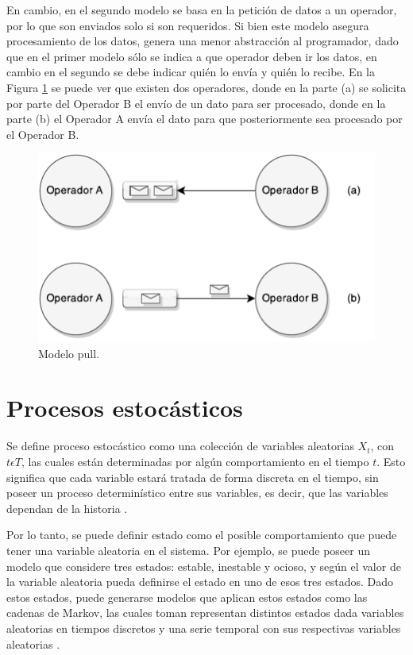 En cambio, en el segundo modelo se basa en la petición de datos a un operador, por lo que son enviados solo si son requeridos. Si bien este modelo asegura procesamiento de los datos, genera una menor abstracción al programador, dado que en el primer modelo sólo se indica a que operador deben ir los datos, en cambio en el segundo se debe indicar quién lo envía y quién lo recibe. En la Figura \ref{fig:sps-pull} se puede ver que existen dos operadores, donde en la parte (a) se solicita por parte del Operador B el envío de un dato para ser procesado, donde en la parte (b) el Operador A envía el dato para que posteriormente sea procesado por el Operador B.

\begin{figure}[ht!]
  \centering
    \includegraphics[scale=1]{images/SPS-Pull.pdf}
  \caption{Modelo pull.}
  \label{fig:sps-pull}
\end{figure}

\section{Procesos estocásticos}
Se define proceso estocástico como una colección de variables aleatorias {$X_t$, con $t \epsilon T$}, las cuales están determinadas por algún comportamiento en el tiempo $t$. Esto significa que cada variable estará tratada de forma discreta en el tiempo, sin poseer un proceso determinístico entre sus variables, es decir, que las variables dependan de la historia \citep{taylor2014introduction}.

Por lo tanto, se puede definir estado como el posible comportamiento que puede tener una variable aleatoria en el sistema. Por ejemplo, se puede poseer un modelo que considere tres estados: estable, inestable y ocioso, y según el valor de la variable aleatoria pueda definirse el estado en uno de esos tres estados. Dado estos estados, puede generarse modelos que aplican estos estados como las cadenas de Markov, las cuales toman representan distintos estados dada variables aleatorias en tiempos discretos y una serie temporal con sus respectivas variables aleatorias \citep{de1978calculus}.

